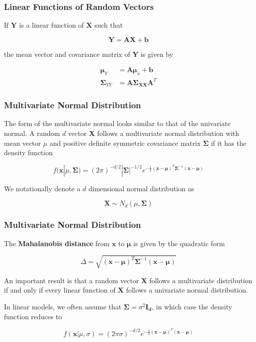 \documentclass{beamer}
\begin{document}
\begin{frame}
\frametitle{Linear Functions of Random Vectors}
If $\mathbf{Y}$ is a linear function of $\mathbf{X}$ such that

$$\mathbf{Y} = \mathbf{AX} + \mathbf{b}$$

the mean vector and covariance matrix of $\mathbf{Y}$ is given by

\begin{align*}
\mathbf{\mu}_Y &= \mathbf{A\mu}_x + \mathbf{b}\\
\mathbf{\Sigma}_{YY} &= \mathbf{A\Sigma_{XX}A}^T
\end{align*}
\end{frame}

\begin{frame}
\frametitle{Multivariate Normal Distribution}
The form of the multivariate normal looks similar to that of the univariate normal.  A random $d$ vector $\mathbf{X}$ follows a multivariate normal distribution with mean vector $\mu$ and positive definite symmetric covariance matrix $\mathbf{\Sigma}$ if it has the density function

$$f(\mathbf{x}|\mu, \mathbf{\Sigma}) = (2\pi)^{-d/2}|\mathbf{\Sigma}|^{-1/2} e^{-\frac{1}{2} (\mathbf{x} - \mathbf{\mu})^T \mathbf{\Sigma}^{-1}(\mathbf{x} - \mathbf{\mu})}$$

We notationally denote a $d$ dimensional normal distribution as 

$$\mathbf{X} \sim N_d(\mu, \mathbf{\Sigma})$$
\end{frame}

\begin{frame}
\frametitle{Multivariate Normal Distribution}
The \textbf{Mahalanobis distance} from $\mathbf{x}$ to $\mathbf{\mu}$ is given by the quadratic form

$$\Delta = \sqrt{(\mathbf{x} - \mathbf{\mu})^T \mathbf{\Sigma}^{-1}(\mathbf{x} - \mathbf{\mu})}$$

An important result is that a random vector $\mathbf{X}$ follows a multivariate distribution if and only if every linear function of $\mathbf{X}$ follows a univariate normal distribution.
\vspace{5mm}

In linear models, we often assume that $\mathbf{\Sigma} = \sigma^2\mathbf{I_d}$, in which case the density function reduces to

$$f(\mathbf{x}|\mu, \sigma) = (2\pi \sigma)^{-d/2} e^{-\frac{1}{2} (\mathbf{x} - \mathbf{\mu})^T (\mathbf{x} - \mathbf{\mu})}$$
\end{frame}
\end{document}
